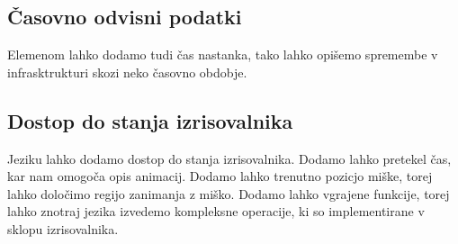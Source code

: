 \documentclass{article}
\begin{document}
\subsection{Časovno odvisni podatki}
Elemenom lahko dodamo tudi čas nastanka, tako lahko opišemo spremembe v infrasktrukturi skozi neko časovno obdobje.

\subsection{Dostop do stanja izrisovalnika}

Jeziku lahko dodamo dostop do stanja izrisovalnika.
Dodamo lahko pretekel čas, kar nam omogoča opis animacij.
Dodamo lahko trenutno pozicjo miške, torej lahko določimo regijo zanimanja z miško.
Dodamo lahko vgrajene funkcije, torej lahko znotraj jezika izvedemo kompleksne operacije, ki so implementirane v sklopu izrisovalnika.
\end{document}
